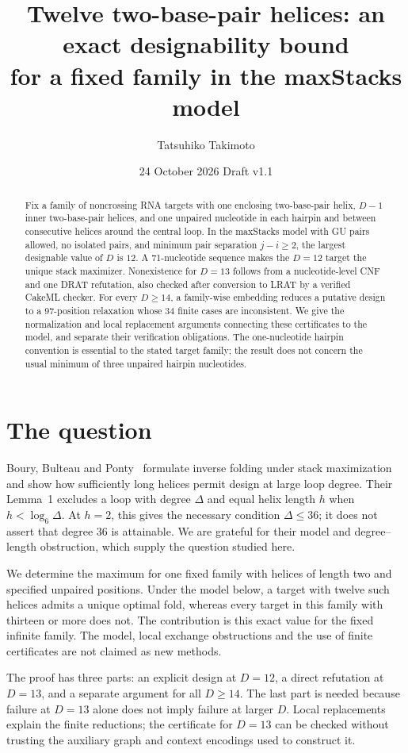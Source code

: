 \documentclass[11pt,a4paper]{article}
\title{Twelve two-base-pair helices: an exact designability bound\protect\\
for a fixed family in the maxStacks model}
\author{Tatsuhiko Takimoto}
\date{24 October 2026 \quad Draft v1.1}
\theoremstyle{definition}
\begin{document}
\maketitle
\begin{abstract}
Fix a family of noncrossing RNA targets with one enclosing two-base-pair
helix, $D-1$ inner two-base-pair helices, and one unpaired nucleotide in
each hairpin and between consecutive helices around the central loop.
In the maxStacks model with GU pairs allowed, no isolated pairs, and
minimum pair separation $j-i\geq2$, the largest designable value of $D$
is $12$. A 71-nucleotide sequence makes the $D=12$ target the unique
stack maximizer. Nonexistence for $D=13$ follows from a nucleotide-level
CNF and one DRAT refutation, also checked after conversion to LRAT
by a verified CakeML checker. For every $D\geq14$, a family-wise embedding
reduces a putative design to a 97-position relaxation whose 34 finite
cases are inconsistent. We give the normalization and local replacement
arguments connecting these certificates to the model, and separate
their verification obligations. The one-nucleotide hairpin convention
is essential to the stated target family; the result does not concern
the usual minimum of three unpaired hairpin nucleotides.
\end{abstract}

\section{The question}
Boury, Bulteau and Ponty~\cite{BBP} formulate inverse folding under stack
maximization and show how sufficiently long helices permit design at
large loop degree. Their Lemma~1 excludes a loop with degree $\Delta$
and equal helix length $h$ when $h<\log_6\Delta$. At $h=2$, this gives
the necessary condition $\Delta\leq36$; it does not assert that degree
$36$ is attainable. We are grateful for their model and degree--length
obstruction, which supply the question studied here.

We determine the maximum for one fixed family with helices of length
two and specified unpaired positions. Under the model below, a target
with twelve such helices admits a unique optimal fold, whereas every
target in this family with thirteen or more does not. The contribution
is this exact value for the fixed infinite family. The model, local
exchange obstructions and the use of finite certificates are not
claimed as new methods.

The proof has three parts: an explicit design at $D=12$, a direct
refutation at $D=13$, and a separate argument for all $D\geq14$.
The last part is needed because failure at $D=13$ alone does not imply
failure at larger $D$. Local replacements explain the finite reductions;
the certificate for $D=13$ can be checked without trusting the auxiliary
graph and context encodings used to construct it.
\end{document}
